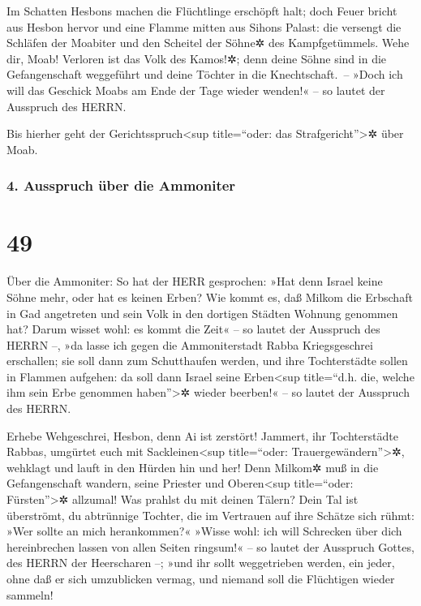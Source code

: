 Im Schatten Hesbons machen die Flüchtlinge erschöpft
halt; doch Feuer bricht aus Hesbon hervor und eine Flamme mitten aus
Sihons Palast: die versengt die Schläfen der Moabiter und den Scheitel
der Söhne✲ des Kampfgetümmels. Wehe dir, Moab! Verloren
ist das Volk des Kamos!✲; denn deine Söhne sind in die Gefangenschaft
weggeführt und deine Töchter in die Knechtschaft.~--
»Doch ich will das Geschick Moabs am Ende der Tage wieder
wenden!« -- so lautet der Ausspruch des HERRN.

Bis hierher geht der Gerichtsspruch\textless sup title=``oder: das
Strafgericht''\textgreater✲ über Moab.

\hypertarget{ausspruch-uxfcber-die-ammoniter}{%
\subsubsection{4. Ausspruch über die
Ammoniter}\label{ausspruch-uxfcber-die-ammoniter}}

\hypertarget{section-48}{%
\section{49}\label{section-48}}

Über die Ammoniter: So hat der HERR gesprochen: »Hat denn
Israel keine Söhne mehr, oder hat es keinen Erben? Wie kommt es, daß
Milkom die Erbschaft in Gad angetreten und sein Volk in den dortigen
Städten Wohnung genommen hat? Darum wisset wohl: es kommt
die Zeit« -- so lautet der Ausspruch des HERRN --, »da lasse ich gegen
die Ammoniterstadt Rabba Kriegsgeschrei erschallen; sie soll dann zum
Schutthaufen werden, und ihre Tochterstädte sollen in Flammen aufgehen:
da soll dann Israel seine Erben\textless sup title=``d.h. die, welche
ihm sein Erbe genommen haben''\textgreater✲ wieder beerben!« -- so
lautet der Ausspruch des HERRN.

Erhebe Wehgeschrei, Hesbon, denn Ai ist zerstört! Jammert,
ihr Tochterstädte Rabbas, umgürtet euch mit Sackleinen\textless sup
title=``oder: Trauergewändern''\textgreater✲, wehklagt und lauft in den
Hürden hin und her! Denn Milkom✲ muß in die Gefangenschaft wandern,
seine Priester und Oberen\textless sup title=``oder:
Fürsten''\textgreater✲ allzumal! Was prahlst du mit deinen
Tälern? Dein Tal ist überströmt, du abtrünnige Tochter, die im Vertrauen
auf ihre Schätze sich rühmt: »Wer sollte an mich herankommen?«
»Wisse wohl: ich will Schrecken über dich hereinbrechen
lassen von allen Seiten ringsum!« -- so lautet der Ausspruch Gottes, des
HERRN der Heerscharen --; »und ihr sollt weggetrieben werden, ein jeder,
ohne daß er sich umzublicken vermag, und niemand soll die Flüchtigen
wieder sammeln!

